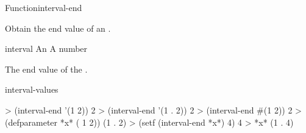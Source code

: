 \documentclass[10pt,twoside,english,pdftex]{article}
\begin{document}
\begin{functiondoc}{Function}{interval-end}%
  {
    \returns{} }
%
%

\fnsyntax

\fnpurpose Obtain the end value of an .

\fnsetf
{}

\fnpackage {}

\fnmodule {}

\fnargs
\begin{args}{interval}
\arg[interval] An 
 A number
\end{args}

\fnreturns The end value of the .

\begin{alsos}{interval-values}
\end{alsos}

\fnexamples
%
%
\W\supp
\begin{example}
> (interval-end '(1 2))
2
> (interval-end '(1 . 2))
2
> (interval-end #(1  2))
2\goodpagebreak
> (defparameter *x* ( 1 2))
(1 . 2)
> (setf (interval-end *x*) 4)
4
> *x*
(1 . 4)
\end{example}

\end{functiondoc}

\end{document}
